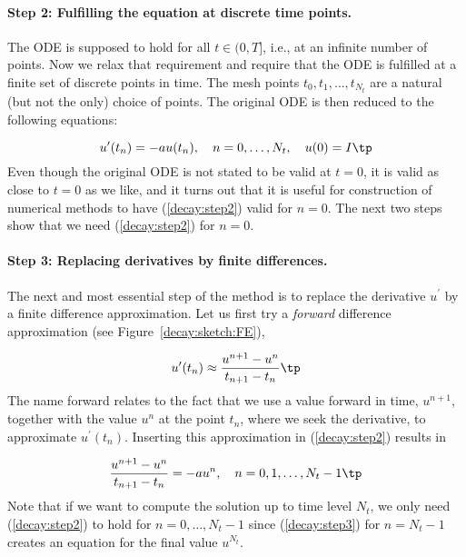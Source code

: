 \documentclass[graybox,sectrefs,envcountresetchap,open=right,final]{svmonodo}
\begin{document}
\paragraph{Step 2: Fulfilling the equation at discrete time points.}
The ODE is supposed to hold for all $t\in (0,T]$, i.e., at an infinite
number of points. Now we relax that requirement and require that
the ODE is fulfilled at a finite set of discrete points in time.
The mesh points $t_0,t_1,\ldots,t_{N_t}$ are a natural
(but not the only) choice of points.
The original ODE is then reduced to  the following equations:

\begin{equation}
u^{\prime}(t_n) = -au(t_n),\quad n=0,\ldots,N_t,\quad u(0)=I\tp
\label{decay:step2}
\end{equation}
Even though the original ODE is not stated to be valid at $t=0$, it
is valid as close to $t=0$ as we like, and it turns out that it
is useful for construction of numerical methods to have
(\ref{decay:step2}) valid for $n=0$. The next two steps show that we
need (\ref{decay:step2}) for $n=0$.


\paragraph{Step 3: Replacing derivatives by finite differences.}
The next and most essential step of the method is to replace the
derivative $u^{\prime}$ by a finite difference approximation. Let us first
try a \emph{forward} difference approximation (see Figure~\ref{decay:sketch:FE}),

 

\begin{equation}
u^{\prime}(t_n) \approx \frac{u^{n+1}-u^{n}}{t_{n+1}-t_n}\tp
\label{decay:FEdiff}
\end{equation}
The name forward relates to the fact that we use a value forward in
time, $u^{n+1}$, together with the value $u^n$ at the point $t_n$, where
we seek the derivative, to approximate $u^{\prime}(t_n)$.
Inserting this approximation in (\ref{decay:step2}) results in

\begin{equation}
\frac{u^{n+1}-u^{n}}{t_{n+1}-t_n} = -au^{n},\quad n=0,1,\ldots,N_t-1\tp
\label{decay:step3}
\end{equation}
Note that if we want to compute the solution
up to time level $N_t$,
we only need (\ref{decay:step2}) to hold for $n=0,\ldots,N_t-1$ since
(\ref{decay:step3}) for $n=N_t-1$ creates an equation for the final
value $u^{N_t}$.
\end{document}
